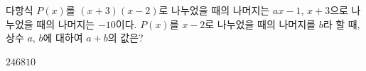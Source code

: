 다항식 $P(x)$를 $(x+3)(x-2)$로 나누었을 때의 나머지는 $ax-1$, $x+3$으로 나누었을 때의 나머지는 $-10$이다. $P(x)$를 $x-2$로 나누었을 때의 나머지를 $b$라 할 때, 상수 $a$, $b$에 대하여 $a+b$의 값은?
\begin{choices32}{$2$}{$4$}{$6$}{$8$}{$10$}\end{choices32}
